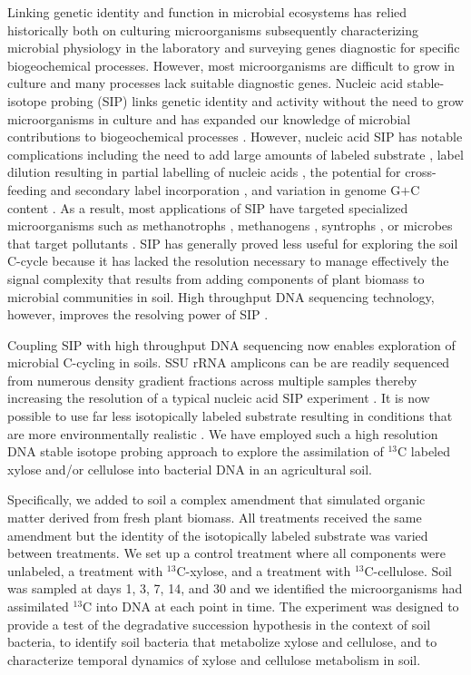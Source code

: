 Linking genetic identity and function in microbial ecosystems has relied
historically both on culturing microorganisms subsequently characterizing
microbial physiology in the laboratory and surveying genes diagnostic for
specific biogeochemical processes. However, most
microorganisms are difficult to grow in culture \citep{Janssen2006} and many
processes lack suitable diagnostic genes. Nucleic acid stable-isotope probing
(SIP) links genetic identity and activity without the need to grow
microorganisms in culture and has expanded our knowledge of microbial
contributions to biogeochemical processes \citep{Chen_Murrell_2010}. However,
nucleic acid SIP has notable complications including the need to add large
amounts of labeled substrate \citep{radajewski2000stable}, label dilution
resulting in partial labelling of nucleic acids
\citep{radajewski2000stable,Manefield_2002,McDonald_2005}, the potential for
cross-feeding and secondary label incorporation
\citep{Morris_2002,Hutchens2004,14686943,DeRito2005,McDonald_2005,Ziegler_2005},
and variation in genome G$+$C content
\citep{Buckley_2007,9780408708036,Holben1995,Nusslein1999}. As a result, most
applications of SIP have targeted specialized microorganisms such as
methanotrophs \citep{radajewski2000stable}, methanogens \citep{lu2005},
syntrophs \citep{lueders2004}, or microbes that target pollutants
\citep{delrito2005}. SIP has generally proved less useful for exploring the
soil C-cycle because it has lacked the resolution necessary to manage
effectively the signal complexity that results from adding components of plant
biomass to microbial communities in soil. High throughput DNA sequencing
technology, however, improves the resolving power of SIP \citep{Aoyagi2015}. 

Coupling SIP with high throughput DNA sequencing now enables exploration of
microbial C-cycling in soils. SSU rRNA amplicons can be are readily sequenced
from numerous density gradient fractions across multiple samples thereby
increasing the resolution of a typical nucleic acid SIP experiment
\citep{Verastegui_2014}. It is now possible to use far less isotopically
labeled substrate resulting in conditions that are more environmentally
realistic \citep{Aoyagi2015}. We have employed such a high resolution DNA
stable isotope probing approach to explore the assimilation of $^{13}$C labeled
xylose and/or cellulose into bacterial DNA in an agricultural soil. 

Specifically, we added to soil a complex amendment that simulated organic
matter derived from fresh plant biomass. All treatments received the same
amendment but the identity of the isotopically labeled substrate was varied
between treatments. We set up a control treatment where all components were
unlabeled, a treatment with $^{13}$C-xylose, and a treatment with
$^{13}$C-cellulose. Soil was sampled at days 1, 3, 7, 14, and 30 and we
identified the microorganisms had assimilated $^{13}$C into DNA at each point
in time. The experiment was designed to provide a test of the
degradative succession hypothesis in the context of soil bacteria, to identify
soil bacteria that metabolize xylose and cellulose, and to characterize
temporal dynamics of xylose and cellulose metabolism in soil. 
